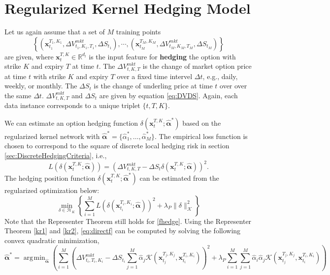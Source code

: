 \documentclass[letterpaper,12pt,titlepage,oneside,final]{book}
\numberwithin{equation}{section}
\theoremstyle{definition}
\newcommand{\vx}{\mathbf{x}}
\newcommand{\HK}{\mathcal{H}_K}
\newcommand{\DS}{\Delta S}
\newcommand{\DT}{\Delta t}
\newcommand{\Real}{\mathbb{R}}
\DeclareMathOperator*{\argmin}{\arg\!\min}
\newcommand{\valpha}{\pmb{\widehat{\alpha}}}
\newcommand{\Vmkt}{V^{mkt}}
\newcommand{\Smkt}{S}
\begin{document}
\section{Regularized Kernel Hedging Model}
\label{sec:KernelDirect}
Let us again assume that a set of $M$ training points 
\[
 \left\{ (\vx_{t_1}^{T_1,K_1},\Delta V^{mkt}_{t_1,K_1,T_1},\Delta \Smkt_{t_1}), \cdots, (\vx_{t_M}^{T_M,K_M},\Delta V^{mkt}_{t_M,K_M,T_M},\Delta \Smkt_{t_M})\right\} \]
 are given, where
$
\vx_{t}^{T,K}  \in \Real^{d_l}
$ is the input feature for \textbf{hedging} the option with strike $K$ and expiry $T$ at time $t$. The $\Delta V^{mkt}_{t,K,T}$ is the change of  market option price at time $t$ with strike $K$ and expiry $T$ over a fixed time intervel $\DT$, e.g., daily, weekly, or monthly. The $\Delta \Smkt_{t}$ is the change of  underling price at time $t$ over  over the same $\DT$. 
$\Delta V^{mkt}_{t,K,T}$ and  $\Delta \Smkt_{t}$  are given by
equation \eqref{eq:DVDS}.
Again, each data instance corresponds to a unique triplet $\{t,T,K\}$.

We can estimate an option hedging function $\delta(\vx_{t}^{T,K};{\valpha^*})$ based on the regularized kernel network with $\valpha^*=\{\widehat{\alpha}^*_1,\dots,\widehat{\alpha}^*_M\}$. The empirical loss function is chosen to correspond to the square of discrete local hedging risk in section \ref{sec:DiscreteHedgingCriteria}, i.e., 
\begin{equation}\label{eq:HR}
L\left(\delta(\vx_{t}^{T,K};\valpha)\right)=\left(\Delta V^{mkt}_{t,K,T}-\DS_{t} \delta(\vx_{t}^{T,K};\valpha)\right)^2.
\end{equation}
The hedging position function $\delta(\vx_{t}^{T,K};\valpha^*)$  can be estimated from  the regularized optimization below:
\begin{equation} \label{fhedge}
\min_{\delta \in \HK}\left\{\sum_{i=1}^M L\left(\delta(\vx_{t_i}^{T_i,K_i};\valpha)\right)^2+\lambda_P \|\delta\|^2_\mathcal{K}\right\}
\end{equation}
Note that the Representer Theorem still holds for \eqref{fhedge}.
Using the Representer Theorem \eqref{kr1} and \eqref{kr2}, \eqref{eq:directf} can be computed by solving the following convex quadratic minimization,
\begin{equation}
	\valpha^*=\argmin_{\mathbf{\valpha}} \left(  \sum_{i=1}^M \left( \Delta \Vmkt_{t_i,T_i,K_i}-\Delta S_{t_i} \sum_{j=1}^M \widehat{\alpha}_j \mathcal{K}(\vx_{t_j}^{T_j,K_j},\vx_{t_i}^{T_i,K_i}) \right)^2+\lambda_P \sum_{i=1}^M\sum_{j=1}^M  \widehat{\alpha}_i \widehat{\alpha}_j \mathcal{K}(\vx_{t_j}^{T_j,K_j},\vx_{t_i}^{T_i,K_i})\right)
	\label{eq:directf}
\end{equation}
\end{document}
